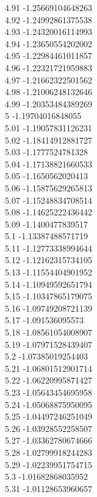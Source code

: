 {4.91	-1.25669104648263\\
4.92	-1.24992861375538\\
4.93	-1.24320016114993\\
4.94	-1.23650554202002\\
4.95	-1.22984461011857\\
4.96	-1.22321721959883\\
4.97	-1.21662322501562\\
4.98	-1.21006248132646\\
4.99	-1.20353484389269\\
5	-1.19704016848055\\
5.01	-1.19057831126231\\
5.02	-1.18414912881727\\
5.03	-1.1777524781328\\
5.04	-1.17138821660533\\
5.05	-1.1650562020413\\
5.06	-1.15875629265813\\
5.07	-1.15248834708514\\
5.08	-1.14625222436442\\
5.09	-1.1400477839517\\
5.1	-1.13387488571719\\
5.11	-1.12773338994644\\
5.12	-1.12162315734105\\
5.13	-1.11554404901952\\
5.14	-1.10949592651794\\
5.15	-1.10347865179075\\
5.16	-1.09749208721139\\
5.17	-1.091536095573\\
5.18	-1.08561054008907\\
5.19	-1.07971528439407\\
5.2	-1.07385019254403\\
5.21	-1.06801512901714\\
5.22	-1.06220995871427\\
5.23	-1.05643454695958\\
5.24	-1.05068875950095\\
5.25	-1.04497246251049\\
5.26	-1.03928552258507\\
5.27	-1.03362780674666\\
5.28	-1.02799918244283\\
5.29	-1.02239951754715\\
5.3	-1.01682868035952\\
5.31	-1.01128653960657\\
}
